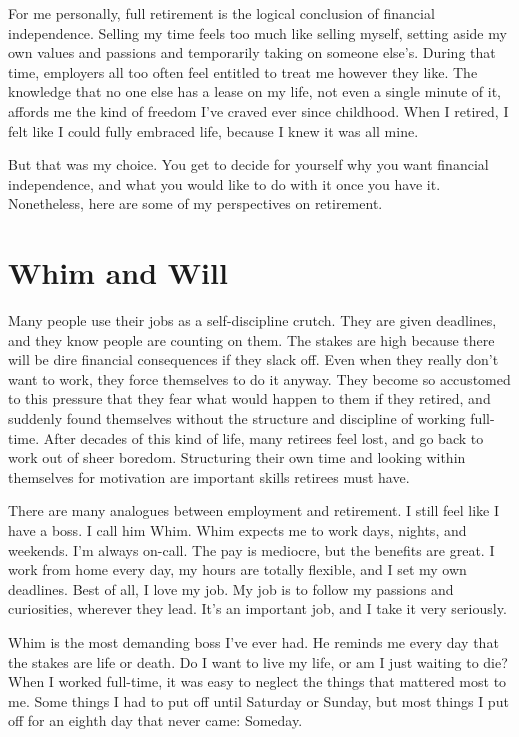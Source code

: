 For me personally, full retirement is the logical conclusion of financial independence. Selling my time feels too much like selling myself, setting aside my own values and passions and temporarily taking on someone else's. During that time, employers all too often feel entitled to treat me however they like. The knowledge that no one else has a lease on my life, not even a single minute of it, affords me the kind of freedom I've craved ever since childhood. When I retired, I felt like I could fully embraced life, because I knew it was all mine.

But that was my choice. You get to decide for yourself why you want financial independence, and what you would like to do with it once you have it. Nonetheless, here are some of my perspectives on retirement.

\section{Whim and Will}
Many people use their jobs as a self-discipline crutch. They are given deadlines, and they know people are counting on them. The stakes are high because there will be dire financial consequences if they slack off. Even when they really don't want to work, they force themselves to do it anyway. They become so accustomed to this pressure that they fear what would happen to them if they retired, and suddenly found themselves without the structure and discipline of working full-time. After decades of this kind of life, many retirees feel lost, and go back to work out of sheer boredom. Structuring their own time and looking within themselves for motivation are important skills retirees must have.

There are many analogues between employment and retirement. I still feel like I have a boss. I call him Whim. Whim expects me to work days, nights, and weekends. I'm always on-call. The pay is mediocre, but the benefits are great. I work from home every day, my hours are totally flexible, and I set my own deadlines. Best of all, I love my job. My job is to follow my passions and curiosities, wherever they lead. It's an important job, and I take it very seriously.

Whim is the most demanding boss I've ever had. He reminds me every day that the stakes are life or death. Do I want to live my life, or am I just waiting to die? When I worked full-time, it was easy to neglect the things that mattered most to me. Some things I had to put off until Saturday or Sunday, but most things I put off for an eighth day that never came: Someday.

